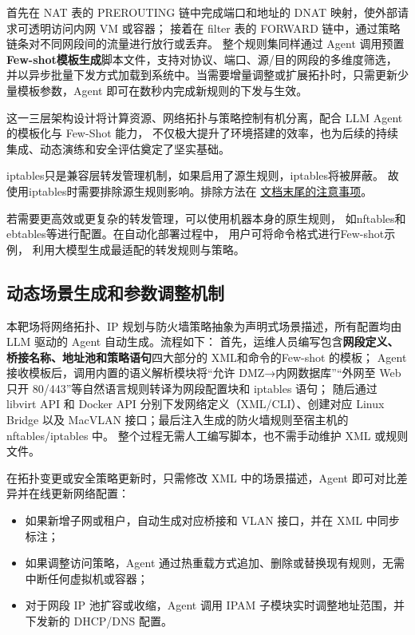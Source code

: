 \documentclass[lang=cn,10pt]{elegantbook}
\begin{document}
首先在 NAT 表的 PREROUTING 链中完成端口和地址的 DNAT 映射，使外部请求可透明访问内网 VM 或容器；
接着在 filter 表的 FORWARD 链中，通过策略链条对不同网段间的流量进行放行或丢弃。
整个规则集同样通过 Agent 调用预置\textbf{Few-shot模板生成}脚本文件，支持对协议、端口、源/目的网段的多维度筛选，
并以异步批量下发方式加载到系统中。当需要增量调整或扩展拓扑时，只需更新少量模板参数，Agent 即可在数秒内完成新规则的下发与生效。

这一三层架构设计将计算资源、网络拓扑与策略控制有机分离，配合 LLM Agent 的模板化与 Few-Shot 能力，
不仅极大提升了环境搭建的效率，也为后续的持续集成、动态演练和安全评估奠定了坚实基础。

\begin{tcolorbox}[colframe=black!30!red, colback=red!5!white, title=注意]

iptables只是兼容层转发管理机制，如果启用了源生规则，iptables将被屏蔽。
故使用iptables时需要排除源生规则影响。排除方法在
\hyperlink{subsec:forward_setting}{文档末尾的注意事项}。

若需要更高效或更复杂的转发管理，可以使用机器本身的原生规则，
如nftables和ebtables等进行配置。在自动化部署过程中，
用户可将命令格式进行Few-shot示例，
利用大模型生成最适配的转发规则与策略。
\end{tcolorbox}


\subsection{动态场景生成和参数调整机制}

本靶场将网络拓扑、IP 规划与防火墙策略抽象为声明式场景描述，所有配置均由 LLM 驱动的 Agent 自动生成。流程如下：  
首先，运维人员编写包含\textbf{网段定义、桥接名称、地址池和策略语句}四大部分的 XML和命令的Few-shot 的模板；  
Agent 接收模板后，调用内置的语义解析模块将“允许 DMZ→内网数据库”“外网至 Web 只开 80/443”等自然语言规则转译为网段配置块和 iptables 语句；  
随后通过 libvirt API 和 Docker API 分别下发网络定义（XML/CLI）、创建对应 Linux Bridge 以及 MacVLAN 接口；最后注入生成的防火墙规则至宿主机的 nftables/iptables 中。  
整个过程无需人工编写脚本，也不需手动维护 XML 或规则文件。

在拓扑变更或安全策略更新时，只需修改 XML 中的场景描述，Agent 即可对比差异并在线更新网络配置：  
\begin{itemize}
  \item 如果新增子网或租户，自动生成对应桥接和 VLAN 接口，并在 XML 中同步标注；  
  \item 如果调整访问策略，Agent 通过热重载方式追加、删除或替换现有规则，无需中断任何虚拟机或容器；  
  \item 对于网段 IP 池扩容或收缩，Agent 调用 IPAM 子模块实时调整地址范围，并下发新的 DHCP/DNS 配置。  
\end{itemize}
\end{document}
